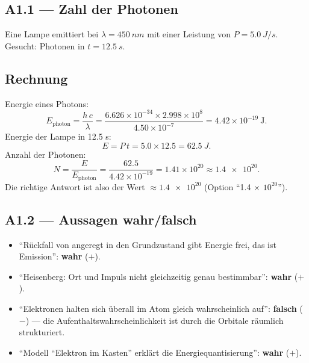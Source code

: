 
\subsection*{A1.1 --- Zahl der Photonen}
Eine Lampe emittiert bei $\lambda = \qty{450}{nm}$ mit einer Leistung von
$P = \qty{5.0}{J/s}$. Gesucht: Photonen in $t = \qty{12.5}{s}$.

\subsection*{Rechnung}
Energie eines Photons:
\begin{equation*}
  E_{\text{photon}} = \frac{h\,c}{\lambda}
  = \frac{6.626\times10^{-34}\times 2.998\times10^{8}}
       {4.50\times10^{-7}}
  = 4.42\times10^{-19}\ \mathrm{J}.
\end{equation*}
Energie der Lampe in 12.5 s:
\begin{equation*}
  E = P\,t = 5.0 \times 12.5 = \qty{62.5}{J}.
\end{equation*}
Anzahl der Photonen:
\begin{equation*}
  N = \frac{E}{E_{\text{photon}}}
  = \frac{62.5}{4.42\times10^{-19}}
  = 1.41\times10^{20}
  \approx \num{1.4e20}.
\end{equation*}
Die richtige Antwort ist also der Wert $\approx \num{1.4e20}$
(Option ``1.4$\,\times\,10^{20}$'').

\subsection*{A1.2 --- Aussagen wahr/falsch}
\begin{itemize}
  \item ``Rückfall von angeregt in den Grundzustand gibt Energie frei,
        das ist Emission'': \textbf{wahr} ($+$).
  \item ``Heisenberg: Ort und Impuls nicht gleichzeitig genau bestimmbar'':
        \textbf{wahr} ($+$).
  \item ``Elektronen halten sich überall im Atom gleich wahrscheinlich
        auf'': \textbf{falsch} ($-$) --- die Aufenthaltswahrscheinlichkeit
        ist durch die Orbitale räumlich strukturiert.
  \item ``Modell ``Elektron im Kasten'' erklärt die Energiequantisierung'':
        \textbf{wahr} ($+$).
\end{itemize}

